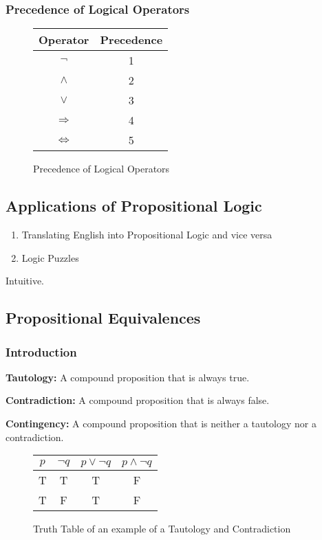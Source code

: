 \documentclass[article, 11pt]{article}
\begin{document}
    \subsubsection{Precedence of Logical Operators}
    \begin{figure}[H]
        \centering
        \begin{tabular}{|c|c|}
            \hline
            Operator & Precedence \\
            \hline
            $\neg$ & 1 \\
            $\land$ & 2 \\
            $\lor$ & 3 \\
            $\Rightarrow$ & 4 \\
            $\Leftrightarrow$ & 5 \\
            \hline        
        \end{tabular}
        \caption{Precedence of Logical Operators}
    \end{figure}
    \subsection{Applications of Propositional Logic}
    \begin{enumerate}
        \item Translating English into Propositional Logic and vice versa
        \item Logic Puzzles 
    \end{enumerate}
    Intuitive. 
    \subsection{Propositional Equivalences}
    \subsubsection{Introduction}
    \textbf{Tautology:} A compound proposition that is always true.

    \textbf{Contradiction:} A compound proposition that is always false.

    \textbf{Contingency:} A compound proposition that is neither a tautology nor a contradiction.

    \begin{figure}[H]
        \centering
        \begin{tabular}{c|c|c|c}
            $p$ & $\neg q$ & $p \lor \neg q$ & $p \land \neg q$ \\
            \hline
            T & T & T & F \\
            T & F & T & F \\
        \end{tabular}
        \caption{Truth Table of an example of a Tautology and Contradiction}
    \end{figure}
\end{document}
